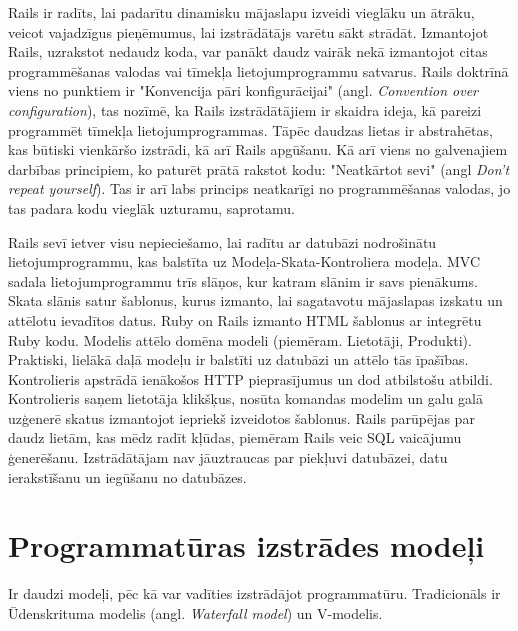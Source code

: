 Rails ir radīts, lai padarītu dinamisku mājaslapu izveidi vieglāku un ātrāku, veicot vajadzīgus pieņēmumus, lai izstrādātājs varētu sākt strādāt. Izmantojot Rails, uzrakstot nedaudz koda, var panākt daudz vairāk nekā izmantojot citas programmēšanas valodas vai tīmekļa lietojumprogrammu satvarus. Rails doktrīnā viens no punktiem ir "Konvencija pāri konfigurācijai" (angl. \textit{Convention over configuration}), tas nozīmē, ka Rails izstrādātājiem ir skaidra ideja, kā pareizi programmēt tīmekļa lietojumprogrammas. Tāpēc daudzas lietas ir abstrahētas, kas būtiski vienkāršo izstrādi, kā arī Rails apgūšanu. Kā arī viens no galvenajiem darbības principiem, ko paturēt prātā rakstot kodu: "Neatkārtot sevi" (angl \textit{Don't repeat yourself}). Tas ir arī labs princips neatkarīgi no programmēšanas valodas, jo tas padara kodu vieglāk uzturamu, saprotamu.
\cite[1.1 nodaļa]{hartlRails} \cite[getting_started]{rails-guides}

Rails sevī ietver visu nepieciešamo, lai radītu ar datubāzi nodrošinātu lietojumprogrammu, kas balstīta uz Modeļa-Skata-Kontroliera  modeļa.
MVC sadala lietojumprogrammu trīs slāņos, kur katram slānim ir savs pienākums.
Skata slānis satur šablonus, kurus izmanto, lai sagatavotu mājaslapas izskatu un attēlotu ievadītos datus. Ruby on Rails izmanto HTML šablonus ar integrētu Ruby kodu.
Modelis attēlo domēna modeli (piemēram. Lietotāji, Produkti). Praktiski, lielākā daļā modeļu ir balstīti uz datubāzi un attēlo tās īpašības.
Kontrolieris apstrādā ienākošos HTTP pieprasījumus un dod atbilstošu atbildi. Kontrolieris saņem lietotāja klikšķus, nosūta komandas modelim un galu galā uzģenerē skatus izmantojot iepriekš izveidotos šablonus.
\cite{rails-api}
Rails parūpējas par daudz lietām, kas mēdz radīt kļūdas, piemēram Rails veic SQL vaicājumu ģenerēšanu. Izstrādātājam nav jāuztraucas par piekļuvi datubāzei, datu ierakstīšanu un iegūšanu no datubāzes.

\chapter{Programmatūras izstrādes modeļi}
Ir daudzi modeļi, pēc kā var vadīties izstrādājot programmatūru. Tradicionāls ir Ūdenskrituma modelis (angl. \textit{Waterfall model}) un V-modelis.
